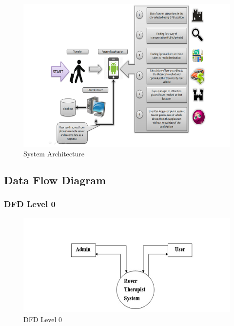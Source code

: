 \documentclass[12pt,a4paper]{article}
\begin{document}
{{{{{{\begin{figure}[!htb]
\centering
\includegraphics[width=15 cm]{System}
\caption{System Architecture}
\end{figure}
\newpage
\subsection{Data Flow Diagram}
\subsubsection{DFD Level 0}
\begin{figure}[!htb]
\centering
\includegraphics[width=15 cm]{level}
\caption{DFD Level 0}
\end{figure}
\newpage
}}}}}}
\end{document}
